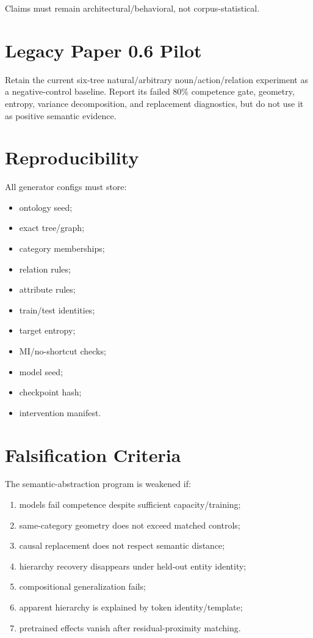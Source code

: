 \documentclass[10pt]{article}
\begin{document}
Claims must remain architectural/behavioral, not corpus-statistical.

\appendix

\section{Legacy Paper 0.6 Pilot}

Retain the current six-tree natural/arbitrary noun/action/relation experiment as a negative-control baseline. Report its failed 80\% competence gate, geometry, entropy, variance decomposition, and replacement diagnostics, but do not use it as positive semantic evidence.

\section{Reproducibility}

All generator configs must store:

\begin{itemize}
\item ontology seed;
\item exact tree/graph;
\item category memberships;
\item relation rules;
\item attribute rules;
\item train/test identities;
\item target entropy;
\item MI/no-shortcut checks;
\item model seed;
\item checkpoint hash;
\item intervention manifest.
\end{itemize}

\section{Falsification Criteria}

The semantic-abstraction program is weakened if:

\begin{enumerate}
\item models fail competence despite sufficient capacity/training;
\item same-category geometry does not exceed matched controls;
\item causal replacement does not respect semantic distance;
\item hierarchy recovery disappears under held-out entity identity;
\item compositional generalization fails;
\item apparent hierarchy is explained by token identity/template;
\item pretrained effects vanish after residual-proximity matching.
\end{enumerate}
\end{document}
